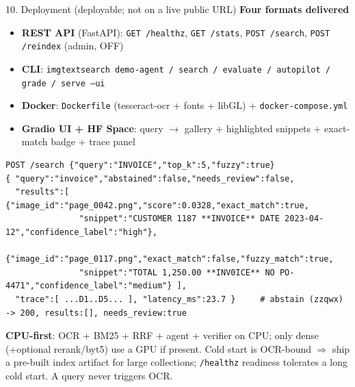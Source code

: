 \documentclass[10pt,aspectratio=169]{beamer}
\begin{document}
\begin{frame}[fragile]{10. Deployment (deployable; not on a live public URL)}
\textbf{Four formats delivered}
\begin{itemize}\small
  \item \textbf{REST API} (FastAPI): \texttt{GET /healthz}, \texttt{GET /stats}, \texttt{POST /search}, \texttt{POST /reindex} (admin, OFF)
  \item \textbf{CLI}: \texttt{imgtextsearch demo-agent / search / evaluate / autopilot / grade / serve --ui}
  \item \textbf{Docker}: \texttt{Dockerfile} (tesseract-ocr + fonts + libGL) + \texttt{docker-compose.yml}
  \item \textbf{Gradio UI + HF Space}: query $\to$ gallery + highlighted snippets + exact-match badge + trace panel
\end{itemize}

\begin{lstlisting}[basicstyle=\ttfamily\tiny]
POST /search {"query":"INVOICE","top_k":5,"fuzzy":true}
{ "query":"invoice","abstained":false,"needs_review":false,
  "results":[ {"image_id":"page_0042.png","score":0.0328,"exact_match":true,
               "snippet":"CUSTOMER 1187 **INVOICE** DATE 2023-04-12","confidence_label":"high"},
              {"image_id":"page_0117.png","exact_match":false,"fuzzy_match":true,
               "snippet":"TOTAL 1,250.00 **INV0ICE** NO PO-4471","confidence_label":"medium"} ],
  "trace":[ ...D1..D5... ], "latency_ms":23.7 }     # abstain (zzqwx) -> 200, results:[], needs_review:true
\end{lstlisting}

\scriptsize \textbf{CPU-first}: OCR + BM25 + RRF + agent + verifier on CPU; only dense (+optional rerank/byt5) use a GPU if present. Cold start is OCR-bound $\Rightarrow$ ship a pre-built index artifact for large collections; \texttt{/healthz} readiness tolerates a long cold start. A query never triggers OCR.
\end{frame}
\end{document}
